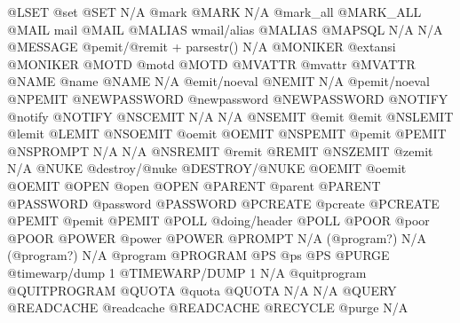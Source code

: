 \documentclass[letterpaper,10pt,english]{sphinxmanual}
\begin{document}
\begin{description}
@LSET                   @set                           @SET
N/A                     @mark                          @MARK
N/A                     @mark\_all                      @MARK\_ALL
@MAIL                   mail                           @MAIL
@MALIAS                 wmail/alias                    @MALIAS
@MAPSQL                 N/A                            N/A
@MESSAGE                @pemit/@remit + parsestr()     N/A
@MONIKER                @extansi                       @MONIKER
@MOTD                   @motd                          @MOTD
@MVATTR                 @mvattr                        @MVATTR
@NAME                   @name                          @NAME
N/A                     @emit/noeval                   @NEMIT
N/A                     @pemit/noeval                  @NPEMIT
@NEWPASSWORD            @newpassword                   @NEWPASSWORD
@NOTIFY                 @notify                        @NOTIFY
@NSCEMIT                N/A                            N/A
@NSEMIT                 @emit                          @emit
@NSLEMIT                @lemit                         @LEMIT
@NSOEMIT                @oemit                         @OEMIT
@NSPEMIT                @pemit                         @PEMIT
@NSPROMPT               N/A                            N/A
@NSREMIT                @remit                         @REMIT
@NSZEMIT                @zemit                         N/A
@NUKE                   @destroy/@nuke                 @DESTROY/@NUKE
@OEMIT                  @oemit                         @OEMIT
@OPEN                   @open                          @OPEN
@PARENT                 @parent                        @PARENT
@PASSWORD               @password                      @PASSWORD
@PCREATE                @pcreate                       @PCREATE
@PEMIT                  @pemit                         @PEMIT
@POLL                   @doing/header                  @POLL
@POOR                   @poor                          @POOR
@POWER                  @power                         @POWER
@PROMPT                 N/A (@program?)                N/A (@program?)
N/A                     @program                       @PROGRAM
@PS                     @ps                            @PS
@PURGE                  @timewarp/dump 1               @TIMEWARP/DUMP 1
N/A                     @quitprogram                   @QUITPROGRAM
@QUOTA                  @quota                         @QUOTA
N/A                     N/A                            @QUERY
@READCACHE              @readcache                     @READCACHE
@RECYCLE                @purge                         N/A

\end{description}
\end{document}
